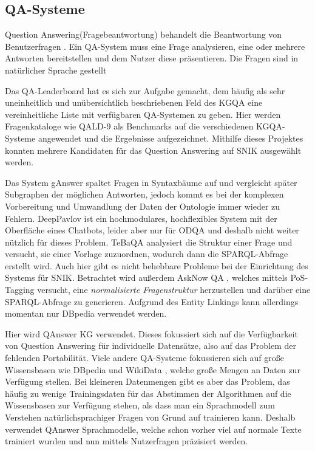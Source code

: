 \documentclass[utf8,biblatex]{lni}
\begin{document}
\subsection{QA-Systeme}

Question Answering(Fragebeantwortung) behandelt die Beantwortung von Benutzerfragen \citep{qadefinition}.
Ein QA-System muss eine Frage analysieren, eine oder mehrere Antworten bereitstellen und dem Nutzer diese präsentieren.
Die Fragen sind in natürlicher Sprache gestellt

Das QA-Leaderboard \citep{leaderboardinproceedings} hat es sich zur Aufgabe gemacht,
dem häufig als sehr uneinheitlich und unübersichtlich \citep{diefenbachkbqa} beschriebenen Feld des KGQA eine vereinheitliche Liste mit verfügbaren QA-Systemen zu geben.
Hier werden Fragenkataloge wie QALD-9 \cite{qald9} als Benchmarks auf die verschiedenen KGQA-Systeme angewendet und die Ergebnisse aufgezeichnet.
Mithilfe dieses Projektes konnten mehrere Kandidaten für das Question Answering auf SNIK ausgewählt werden.

Das System gAnswer \cite{ganswerapproach} spaltet Fragen in Syntaxbäume auf und vergleicht später Subgraphen der möglichen Antworten, jedoch kommt es bei der komplexen Vorbereitung und Umwandlung der Daten der Ontologie immer wieder zu Fehlern.
DeepPavlov \cite{deeppavlov} ist ein hochmodulares, hochflexibles System mit der Oberfläche eines Chatbots, leider aber nur für ODQA und deshalb nicht weiter nützlich für dieses Problem.
TeBaQA \cite{tebaqa} analysiert die Struktur einer Frage und versucht, sie einer Vorlage zuzuordnen, wodurch dann die SPARQL-Abfrage erstellt wird.
Auch hier gibt es nicht behebbare Probleme bei der Einrichtung des Systems für SNIK.
Betrachtet wird außerdem AskNow QA \cite{asknow}, welches mittels PoS-Tagging versucht, eine \emph{normalisierte Fragenstruktur} herzustellen und darüber eine SPARQL-Abfrage zu generieren.
Aufgrund des Entity Linkings kann allerdings momentan nur DBpedia verwendet werden.

Hier wird QAnswer KG \cite{qanswer} verwendet.
Dieses fokussiert sich auf die Verfügbarkeit von Question Answering für individuelle Datensätze,
also auf das Problem der fehlenden Portabilität.
Viele andere QA-Systeme fokussieren sich auf große Wissensbasen wie DBpedia und WikiData \cite{qald9plus},
welche große Mengen an Daten zur Verfügung stellen.
Bei kleineren Datenmengen gibt es aber das Problem, das häufig zu wenige Trainingsdaten für das Abstimmen der Algorithmen auf die Wissensbasen zur Verfügung stehen, als dass man ein Sprachmodell zum Verstehen natürlichsprachiger Fragen von Grund auf trainieren kann.
Deshalb verwendet QAnswer Sprachmodelle, welche schon vorher viel auf normale Texte trainiert wurden und nun mittels Nutzerfragen präzisiert werden.
\end{document}
